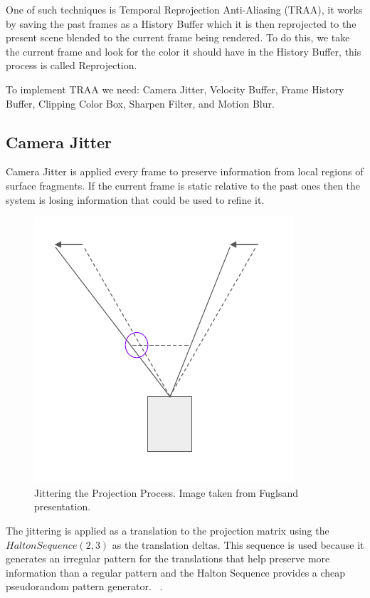 \documentclass{cslthse-msc}
\begin{document}
One of such techniques is Temporal Reprojection Anti-Aliasing (TRAA), it works by saving the past frames as a History Buffer which it is then reprojected to the present scene blended to the current frame being rendered.  To do this, we take the current frame and look for the color it should have in the History Buffer, this process is called Reprojection.

To implement TRAA we need: Camera Jitter, Velocity Buffer, Frame History Buffer, Clipping Color Box, Sharpen Filter, and Motion Blur.

\subsection{Camera Jitter}
Camera Jitter is applied every frame to preserve information from local regions of surface fragments. If the current frame is static relative to the past ones then the system is losing information that could be used to refine it. ~\cite{Fuglsand2016,XU2016}

\begin{figure}[!hbt]
	\centering
	\includegraphics[scale=0.3]{images/camera_jitter.png}
	\caption{Jittering the Projection Process. Image taken from Fuglsand presentation. \protect\cite{Fuglsand2016}}\label{fig:camerajittering}
\end{figure}

The jittering is applied as a translation to the projection matrix using the \(Halton Sequence (2,3)\) as the translation deltas. This sequence is used because it generates an irregular pattern for the translations that help preserve more information than a regular pattern and the Halton Sequence provides a cheap pseudorandom pattern generator. ~\cite{Fuglsand2016,XU2016}. 
\end{document}

